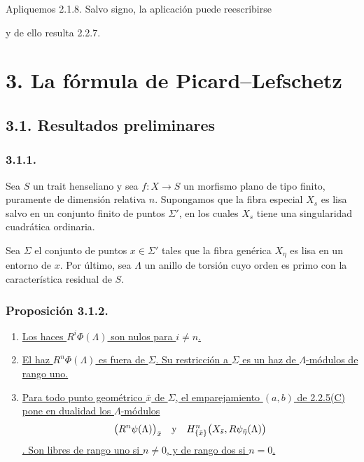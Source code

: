 Apliquemos 2.1.8. Salvo signo, la aplicación puede reescribirse
\begin{center}
\end{center}
y de ello resulta 2.2.7.

\section*{3. La fórmula de Picard--Lefschetz}

\subsection*{3.1. Resultados preliminares}

\subsubsection*{3.1.1.}
Sea $S$ un trait henseliano y sea $f:X\to S$ un morfismo plano de tipo
finito, puramente de dimensión relativa $n$. Supongamos que la fibra
especial $X_s$ es lisa salvo en un conjunto finito de puntos $\Sigma'$,
en los cuales $X_s$ tiene una singularidad cuadrática ordinaria.

\pageoriginale

Sea $\Sigma$ el conjunto de puntos $x\in\Sigma'$ tales que la fibra
genérica $X_\eta$ es lisa en un entorno de $x$. Por último, sea
$\Lambda$ un anillo de torsión cuyo orden es primo con la característica
residual de $S$.

\subsubsection*{Proposición 3.1.2.}
\begin{enumerate}
\item[(i)] \underline{Los haces $R^i\Phi(\Lambda)$ son nulos para
$i\ne n$.}

\item[(ii)] \underline{El haz $R^n\Phi(\Lambda)$ es
 fuera de $\Sigma$. Su restricción a $\Sigma$ es
un haz de $\Lambda$-módulos de rango uno.}

\item[(iii)] \underline{Para todo punto geométrico $\bar x$ de
$\Sigma$, el emparejamiento $(a,b)$ de 2.2.5(C) pone en dualidad los
$\Lambda$-módulos}
\[
\bigl(R^n\psi(\Lambda)\bigr)_{\bar x}
\quad\text{y}\quad
H^n_{\{\bar x\}}\bigl(
\sisi{R^n\psi_{\bar\eta}(\Lambda)}
{X_{\bar s},R\psi_{\bar\eta}(\Lambda)}\bigr)
\]
\underline{. Son libres de rango uno si $n\ne0$, y de rango dos si
$n=0$.}
\end{enumerate}

